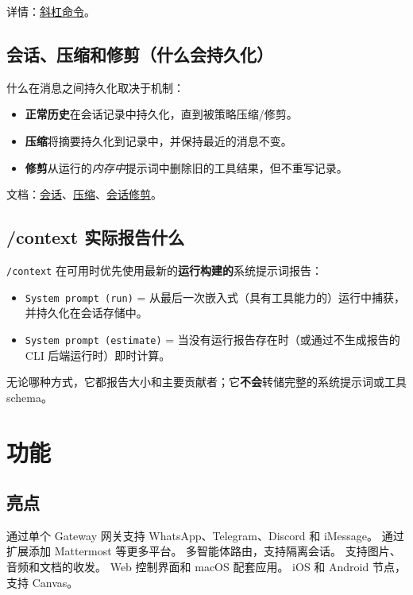 详情：\href{/tools/slash-commands}{斜杠命令}。

\subsection{会话、压缩和修剪（什么会持久化）}


什么在消息之间持久化取决于机制：

\begin{itemize}
  \item \textbf{正常历史}在会话记录中持久化，直到被策略压缩/修剪。
  \item \textbf{压缩}将摘要持久化到记录中，并保持最近的消息不变。
  \item \textbf{修剪}从运行的\textit{内存中}提示词中删除旧的工具结果，但不重写记录。
\end{itemize}


文档：\href{/concepts/session}{会话}、\href{/concepts/compaction}{压缩}、\href{/concepts/session-pruning}{会话修剪}。

\subsection{/context 实际报告什么}


\texttt{/context} 在可用时优先使用最新的\textbf{运行构建的}系统提示词报告：

\begin{itemize}
  \item \texttt{System prompt (run)} = 从最后一次嵌入式（具有工具能力的）运行中捕获，并持久化在会话存储中。
  \item \texttt{System prompt (estimate)} = 当没有运行报告存在时（或通过不生成报告的 CLI 后端运行时）即时计算。
\end{itemize}


无论哪种方式，它都报告大小和主要贡献者；它\textbf{不会}转储完整的系统提示词或工具 schema。


\clearpage

\section{功能}

\subsection{亮点}


通过单个 Gateway 网关支持 WhatsApp、Telegram、Discord 和 iMessage。
通过扩展添加 Mattermost 等更多平台。
多智能体路由，支持隔离会话。
支持图片、音频和文档的收发。
Web 控制界面和 macOS 配套应用。
iOS 和 Android 节点，支持 Canvas。

